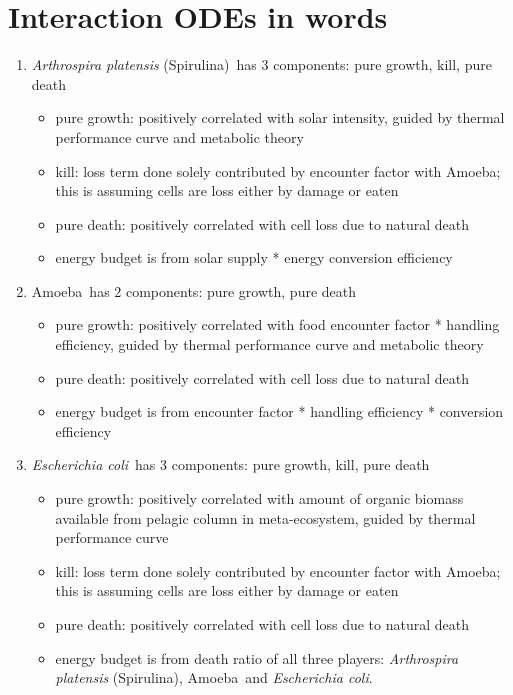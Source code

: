 \documentclass[a4paper,11pt]{article}
\newcommand{\ec}{\textit{Escherichia coli}}
\newcommand{\am}{Amoeba}
\newcommand{\ap}{\textit{Arthrospira platensis} (Spirulina)}
\begin{document}
    \section{Interaction ODEs in words}
    \begin{enumerate}
        \item \ap\ has 3 components: pure growth, kill, pure death
        \begin{itemize}
            \item pure growth: positively correlated with solar intensity, guided by thermal performance curve and metabolic theory\autocite{schramski2015metabolic}
            \item kill: loss term done solely contributed by encounter factor with \am; this is assuming cells are loss either by damage or eaten
            \item pure death: positively correlated with cell loss due to natural death
            \item energy budget is from solar supply * energy conversion efficiency
        \end{itemize}
        
        \item \am\ has 2 components: pure growth, pure death
        \begin{itemize}
            \item pure growth: positively correlated with food encounter factor * handling efficiency, guided by thermal performance curve and metabolic theory\autocite{schramski2015metabolic}
            \item pure death: positively correlated with cell loss due to natural death
            \item energy budget is from encounter factor * handling efficiency * conversion efficiency
        \end{itemize}
        
        \item \ec\ has 3 components: pure growth, kill, pure death
        \begin{itemize}
            \item pure growth: positively correlated with amount of organic biomass available from pelagic column in meta-ecosystem, guided by thermal performance curve
            \item kill: loss term done solely contributed by encounter factor with \am; this is assuming cells are loss either by damage or eaten
            \item pure death: positively correlated with cell loss due to natural death
            \item energy budget is from death ratio of all three players: \ap, \am\ and \ec.
        \end{itemize}
        

\end{enumerate}
\end{document}
